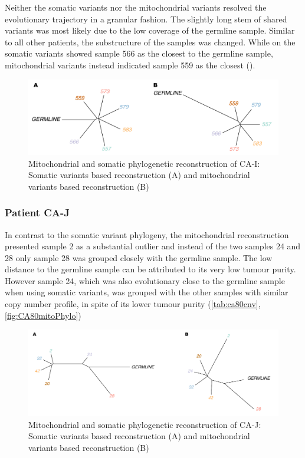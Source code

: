 Neither the somatic variants nor the mitochondrial variants resolved the evolutionary trajectory in a granular fashion. The slightly long stem of shared variants was most likely due to the low coverage of the germline sample. Similar to all other patients, the substructure of the samples was changed. While on the somatic variants showed sample 566 as the closest to the germline sample, mitochondrial variants instead indicated sample 559 as the closest ().


\begin{figure}[ht]
\centering
\includegraphics[width=.99\linewidth]{Figures/CASCADE/mito/CA51SomVsMitoPhylo.pdf}
\caption[Mitochondrial and somatic phylogenetic reconstruction of CA-I]{Mitochondrial and somatic phylogenetic reconstruction of CA-I: Somatic variants based reconstruction (A) and mitochondrial variants based reconstruction (B)} \label{fig:CA51mitoPhylo}
\end{figure}


\subsubsection{Patient CA-J}

In contrast to the somatic variant phylogeny, the mitochondrial reconstruction presented sample 2 as a substantial outlier and instead of the two samples 24 and 28 only sample 28 was grouped closely with the germline sample. The low distance to the germline sample can be attributed to its very low tumour purity. However sample 24, which was also evolutionary close to the germline sample when using somatic variants, was grouped with the other samples with similar copy number profile, in spite of its lower tumour purity (\autoref{tab:ca80cnv}, \autoref{fig:CA80mitoPhylo})

\begin{figure}[ht]
\centering
\includegraphics[width=.99\linewidth]{Figures/CASCADE/mito/CA80SomVsMitoPhylo.pdf}
\caption[Mitochondrial and somatic phylogenetic reconstruction of CA-J]{Mitochondrial and somatic phylogenetic reconstruction of CA-J: Somatic variants based reconstruction (A) and mitochondrial variants based reconstruction (B)} \label{fig:CA80mitoPhylo}
\end{figure}


